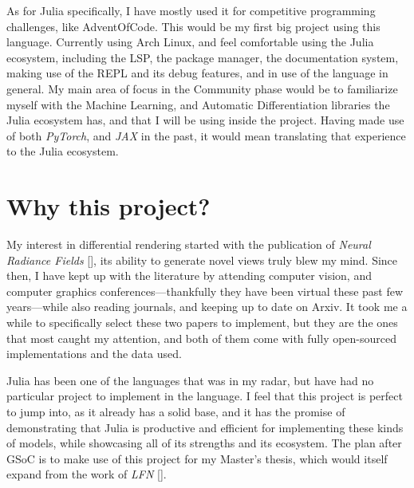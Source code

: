 As for Julia specifically, I have mostly used it for competitive programming challenges, like AdventOfCode. This would be my first big project using this language. Currently using Arch Linux, and feel comfortable using the Julia ecosystem, including the LSP, the package manager, the documentation system, making use of the REPL and its debug features, and in use of the language in general. My main area of focus in the Community phase would be to familiarize myself with the Machine Learning, and Automatic Differentiation libraries the Julia ecosystem has, and that I will be using inside the project. Having made use of both \textit{PyTorch}, and \textit{JAX} in the past, it would mean translating that experience to the Julia ecosystem.


\section*{Why this project?}

My interest in differential rendering started with the publication of \textit{Neural Radiance Fields} [\cite{mildenhall2020nerf}], its ability to generate novel views truly blew my mind. Since then, I have kept up with the literature by attending computer vision, and computer graphics conferences---thankfully they have been virtual these past few years---while also reading journals, and keeping up to date on Arxiv. It took me a while to specifically select these two papers to implement, but they are the ones that most caught my attention, and both of them come with fully open-sourced implementations and the data used.

Julia has been one of the languages that was in my radar, but have had no particular project to implement in the language. I feel that this project is perfect to jump into, as it already has a solid base, and it has the promise of demonstrating that Julia is productive and efficient for implementing these kinds of models, while showcasing all of its strengths and its ecosystem. The plan after GSoC is to make use of this project for my Master's thesis, which would itself expand from the work of \textit{LFN} [\cite{NEURIPS2021_a11ce019}].



\printbibliography